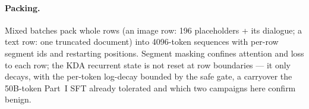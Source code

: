 \paragraph{Packing.} Mixed batches pack whole rows (an image row: 196
placeholders + its dialogue; a text row: one truncated document) into
4096-token sequences with per-row segment ids and restarting
positions. Segment masking confines attention and loss to each row;
the KDA recurrent state is not reset at row boundaries --- it only
decays, with the per-token log-decay bounded by the safe gate, a
carryover the 50B-token Part~I SFT already tolerated and which two
campaigns here confirm benign.
